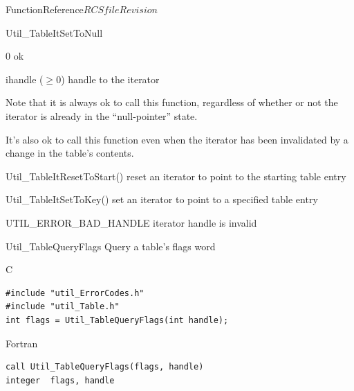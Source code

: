 \begin{cactuspart}{FunctionReference}{$RCSfile$}{$Revision$}
\begin{FunctionDescription}{Util\_TableItSetToNull}
\begin{ResultSection}
\begin{Result}{\rm 0}
ok
\end{Result}
\end{ResultSection}

\begin{ParameterSection}
\begin{Parameter}{ihandle ($\ge 0$)}
handle to the iterator
\end{Parameter}
\end{ParameterSection}

\begin{Discussion}
Note that it is always ok to call this function, regardless of
whether or not the iterator is already in the ``null-pointer'' state.

It's also ok to call this function even when the iterator has been
invalidated by a change in the table's contents.
\end{Discussion}

\begin{SeeAlsoSection}
\begin{SeeAlso}{Util\_TableItResetToStart()}
reset an iterator to point to the starting table entry
\end{SeeAlso}
\begin{SeeAlso}{Util\_TableItSetToKey()}
set an iterator to point to a specified table entry
\end{SeeAlso}
\end{SeeAlsoSection}

\begin{ErrorSection}
\begin{Error}{UTIL\_ERROR\_BAD\_HANDLE}
iterator handle is invalid
\end{Error}
\end{ErrorSection}
\end{FunctionDescription}


\begin{FunctionDescription}{Util\_TableQueryFlags}
Query a table's flags word
\label{Util-TableQueryFlags}

\begin{SynopsisSection}
\begin{Synopsis}{C}
\begin{verbatim}
#include "util_ErrorCodes.h"
#include "util_Table.h"
int flags = Util_TableQueryFlags(int handle);
\end{verbatim}
\end{Synopsis}
\begin{Synopsis}{Fortran}
\begin{verbatim}
call Util_TableQueryFlags(flags, handle)
integer  flags, handle
\end{verbatim}
\end{Synopsis}
\end{SynopsisSection}


\end{FunctionDescription}
\end{cactuspart}

